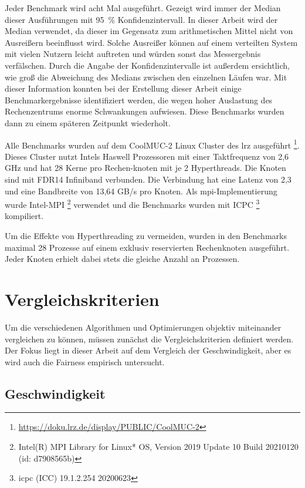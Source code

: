 Jeder Benchmark wird acht Mal ausgeführt.
Gezeigt wird immer der Median dieser Ausführungen mit 95~\% Konfidenzintervall.
In dieser Arbeit wird der Median verwendet,
da dieser im Gegensatz zum arithmetischen Mittel nicht von Ausreißern beeinflusst wird.
Solche Ausreißer können auf einem verteilten System mit vielen Nutzern leicht auftreten
und würden sonst das Messergebnis verfälschen.
Durch die Angabe der Konfidenzintervalle ist außerdem ersichtlich,
wie groß die Abweichung des Medians zwischen den einzelnen Läufen war.
Mit dieser Information konnten bei der Erstellung dieser Arbeit einige Benchmarkergebnisse identifiziert werden,
die wegen hoher Auslastung des Rechenzentrums enorme Schwankungen aufwiesen.
Diese Benchmarks wurden dann zu einem späteren Zeitpunkt wiederholt.

Alle Benchmarks wurden auf dem CoolMUC-2 Linux Cluster des \gls{lrz} ausgeführt%
\footnote{\url{https://doku.lrz.de/display/PUBLIC/CoolMUC-2}}.
Dieses Cluster nutzt Intels Haswell Prozessoren mit einer Taktfrequenz von 2,6 GHz
und hat 28 Kerne pro Rechen-knoten mit je 2 Hyperthreads.
Die Knoten sind mit FDR14 Infiniband verbunden.
Die Verbindung hat eine Latenz von 2,3~
und eine Bandbreite von 13,64 GB/s pro Knoten.
Als \gls{mpi}-Implementierung wurde Intel-MPI%
\footnote{Intel(R) MPI Library for Linux* OS, Version 2019 Update 10 Build 20210120 (id: d7908565b)}
verwendet und die Benchmarks wurden mit ICPC%
\footnote{icpc (ICC) 19.1.2.254 20200623}
kompiliert.

Um die Effekte von Hyperthreading zu vermeiden,
wurden in den Benchmarks maximal 28 Prozesse auf einem exklusiv reservierten Rechenknoten ausgeführt.
Jeder Knoten erhielt dabei stets die gleiche Anzahl an Prozessen.

\section{Vergleichskriterien}
\label{sec:kriterien}

Um die verschiedenen Algorithmen und Optimierungen objektiv miteinander vergleichen zu können,
müssen zunächst die Vergleichskriterien definiert werden.
Der Fokus liegt in dieser Arbeit auf dem Vergleich der Geschwindigkeit,
aber es wird auch die Fairness empirisch untersucht.

\subsection{Geschwindigkeit}
\label{sec:geschwindigkeit}


